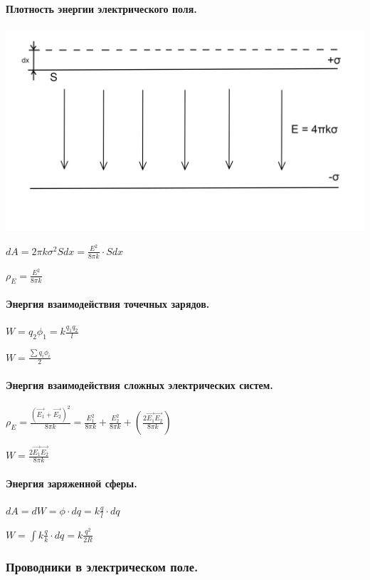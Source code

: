 \documentclass{article}
\begin{document}
            \paragraph{Плотность энергии электрического поля.}
                \includegraphics[scale=0.15]{1_1_13_2-1.png}    

                \(dA = 2\pi k \sigma^2 S dx = \frac{E^2}{8\pi k} \cdot S dx\)

                \(\rho_E = \frac{E^2}{8\pi k}\)
            \paragraph{Энергия взаимодействия точечных зарядов.}
                \(W = q_2\phi_1 = k\frac{q_1q_2}{l}\)

                \(W = \frac{\sum{q_i\phi_i}}{2}\)
            \paragraph{Энергия взаимодействия сложных электрических систем.}
                \(\rho_E = \frac{(\vec{E_1} + \vec{E_2})^2}{8\pi k} = \frac{E_1^2}{8\pi k} + \frac{E_2^2}{8\pi k} + (\frac{2\vec{E_1}\vec{E_2}}{8\pi k})\)

                \(W = \frac{2\vec{E_1}\vec{E_2}}{8\pi k}\)
            \paragraph{Энергия заряженной сферы.}
                \(dA = dW = \phi \cdot dq = k\frac{q}{l}\cdot dq\)

                \(W = \int{k\frac{q}{k}\cdot dq} = k\frac{q^2}{2R}\)
        \subsubsection{Проводники в электрическом поле.}
\end{document}
